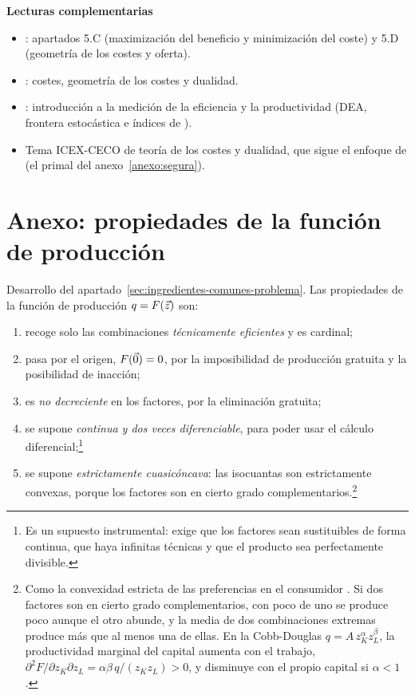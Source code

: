 \documentclass[11pt]{article}
\begin{document}
\begin{anotaciones}
\textbf{Lecturas complementarias}
\begin{itemize}
\item \textcite[cap.~5]{MasColellWhinstonGreen1995}: apartados 5.C (maximización del beneficio y minimización del coste) y 5.D (geometría de los costes y oferta).
\item \textcite[cap.~4-6]{Varian1992Microeconomic}: costes, geometría de los costes y dualidad.
\item \textcite{CoelliEtAl2005Introduction}: introducción a la medición de la eficiencia y la productividad (DEA, frontera estocástica e índices de ).
\item Tema ICEX-CECO de teoría de los costes y dualidad, que sigue el enfoque de \textcite{Segura1986Analisis} (el primal del anexo~\ref{anexo:segura}).
\end{itemize}
\end{anotaciones}

\clearpage
\appendix

\section{Anexo: propiedades de la función de producción}\label{anexo:produccion}

Desarrollo del apartado~\ref{sec:ingredientes-comunes-problema}. Las propiedades de la función de producción $q=F(\vec{z})$ son:
    \begin{enumerate}
    \item recoge solo las combinaciones \emph{técnicamente eficientes} y es cardinal;
    \item pasa por el origen, $F(\vec{0})=0$, por la imposibilidad de producción gratuita y la posibilidad de inacción;
    \item es \emph{no decreciente} en los factores, por la eliminación gratuita;
    \item se supone \emph{continua y dos veces diferenciable}, para poder usar el cálculo diferencial;\footnote{Es un supuesto instrumental: exige que los factores sean sustituibles de forma continua, que haya infinitas técnicas y que el producto sea perfectamente divisible.}
    \item se supone \emph{estrictamente cuasicóncava}: las isocuantas son estrictamente convexas, porque los factores son en cierto grado complementarios.\footnote{Como la convexidad estricta de las preferencias en el consumidor . Si dos factores son en cierto grado complementarios, con poco de uno se produce poco aunque el otro abunde, y la media de dos combinaciones extremas produce más que al menos una de ellas\nocite{JehleReny2011Advanced}. En la Cobb-Douglas $q=A\,z_K^{\alpha}z_L^{\beta}$, la productividad marginal del capital aumenta con el trabajo, $\partial^2F/\partial z_K\partial z_L=\alpha\beta\,q/(z_Kz_L)>0$, y disminuye con el propio capital si $\alpha<1$.}
    \end{enumerate}
\end{document}
